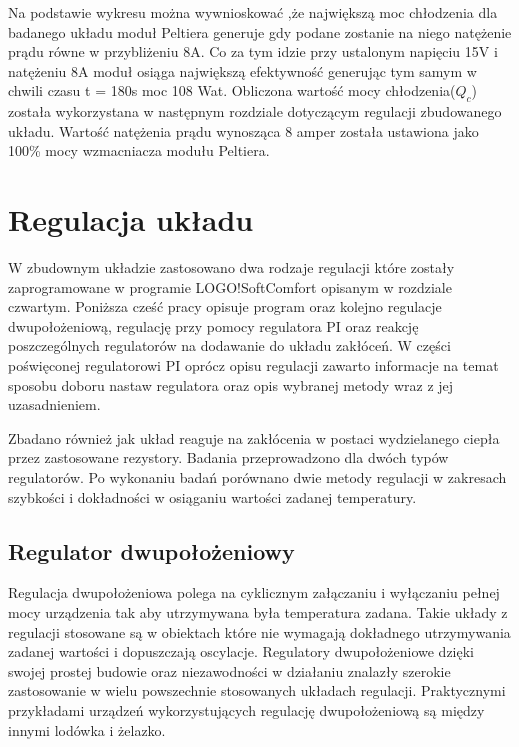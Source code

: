 \documentclass[oneside]{mgr}
\begin{document}
Na podstawie wykresu można wywnioskować ,że największą moc chłodzenia dla badanego układu moduł Peltiera generuje gdy podane zostanie na niego natężenie prądu równe w przybliżeniu 8A. Co za tym idzie przy ustalonym napięciu 15V i natężeniu 8A moduł osiąga największą efektywność generując tym samym w chwili czasu t = 180s moc 108 Wat. Obliczona wartość mocy chłodzenia($Q_c$) została wykorzystana w następnym rozdziale dotyczącym regulacji zbudowanego układu. Wartość natężenia prądu wynosząca 8 amper została ustawiona jako 100\% mocy wzmacniacza modułu Peltiera. 
\chapter{Regulacja układu}
W zbudownym układzie zastosowano dwa rodzaje regulacji które zostały zaprogramowane w programie LOGO!SoftComfort opisanym w rozdziale czwartym. Poniższa cześć pracy opisuje program oraz kolejno regulacje dwupołożeniową, regulację przy pomocy regulatora PI oraz reakcję poszczególnych regulatorów na dodawanie do układu zakłóceń. W części poświęconej regulatorowi PI oprócz opisu regulacji zawarto informacje na temat sposobu doboru nastaw regulatora oraz opis wybranej metody wraz z jej uzasadnieniem.

Zbadano również jak układ reaguje na zakłócenia w postaci wydzielanego ciepła przez zastosowane rezystory. Badania przeprowadzono dla dwóch typów regulatorów. Po wykonaniu badań porównano dwie metody regulacji w zakresach szybkości i dokładności w osiąganiu wartości zadanej temperatury. 
\section{Regulator dwupołożeniowy}
Regulacja dwupołożeniowa polega na cyklicznym załączaniu i wyłączaniu pełnej mocy urządzenia tak aby utrzymywana była temperatura zadana. Takie układy z regulacji stosowane są w obiektach które nie wymagają dokładnego utrzymywania zadanej wartości i dopuszczają oscylacje. Regulatory dwupołożeniowe dzięki swojej prostej budowie oraz niezawodności w działaniu znalazły szerokie zastosowanie w wielu powszechnie stosowanych układach regulacji. Praktycznymi przykładami urządzeń wykorzystujących regulację dwupołożeniową są między innymi lodówka i żelazko.
\end{document}
